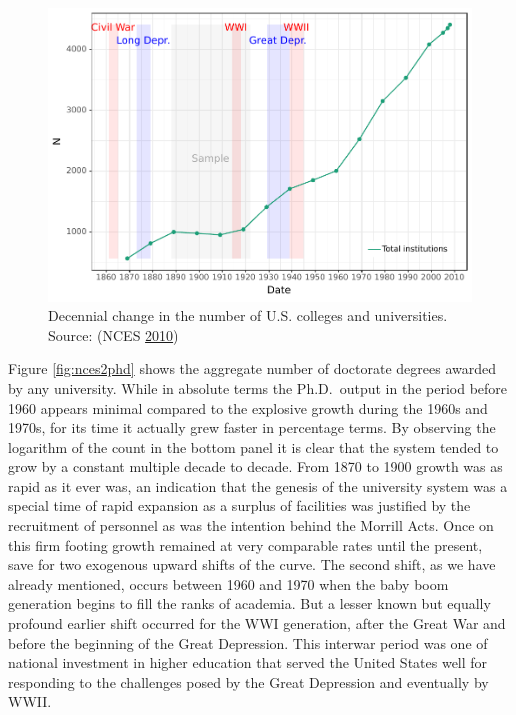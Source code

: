 \documentclass[]{book}
\theoremstyle{definition}
\theoremstyle{definition}
\theoremstyle{definition}
\theoremstyle{remark}
\begin{document}
\begin{figure}

{\centering \includegraphics[width=0.9\linewidth]{04_files/figure-latex/t196-1} 

}

\caption{Decennial change in the number of U.S. colleges and
universities. Source: (NCES \protect\hyperlink{ref-NCES2010Table}{2010})}\label{fig:t196}
\end{figure}

Figure \ref{fig:nces2phd} shows the aggregate number of doctorate
degrees awarded by any university. While in absolute terms the
Ph.D.~output in the period before 1960 appears minimal compared to the
explosive growth during the 1960s and 1970s, for its time it actually
grew faster in percentage terms. By observing the logarithm of the count
in the bottom panel it is clear that the system tended to grow by a
constant multiple decade to decade. From 1870 to 1900 growth was as
rapid as it ever was, an indication that the genesis of the university
system was a special time of rapid expansion as a surplus of facilities
was justified by the recruitment of personnel as was the intention
behind the Morrill Acts. Once on this firm footing growth remained at
very comparable rates until the present, save for two exogenous upward
shifts of the curve. The second shift, as we have already mentioned,
occurs between 1960 and 1970 when the baby boom generation begins to
fill the ranks of academia. But a lesser known but equally profound
earlier shift occurred for the WWI generation, after the Great War and
before the beginning of the Great Depression. This interwar period was
one of national investment in higher education that served the United
States well for responding to the challenges posed by the Great
Depression and eventually by WWII.
\end{document}
